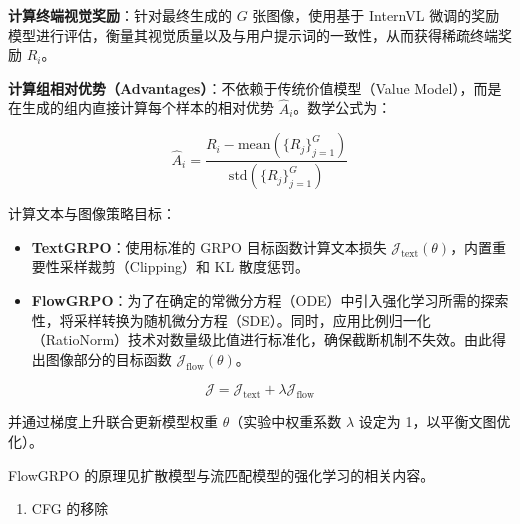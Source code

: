 \textbf{计算终端视觉奖励}：针对最终生成的 \(G\) 张图像，使用基于 InternVL 微调的奖励模型进行评估，衡量其视觉质量以及与用户提示词的一致性，从而获得稀疏终端奖励 \(R_i\)。

\textbf{计算组相对优势（Advantages）}：不依赖于传统价值模型（Value Model），而是在生成的组内直接计算每个样本的相对优势 \(\hat A_i\)。数学公式为：

\[
\hat A_i=
\frac{R_i-\mathrm{mean}(\{R_j\}_{j=1}^{G})}
{\mathrm{std}(\{R_j\}_{j=1}^{G})}
\]

计算文本与图像策略目标：

\begin{itemize}
\tightlist
\item
  \textbf{TextGRPO}：使用标准的 GRPO 目标函数计算文本损失 \(\mathcal{J}_{\mathrm{text}}(\theta)\)，内置重要性采样裁剪（Clipping）和 KL 散度惩罚。
\item
  \textbf{FlowGRPO}：为了在确定的常微分方程（ODE）中引入强化学习所需的探索性，将采样转换为随机微分方程（SDE）。同时，应用比例归一化（RatioNorm）技术对数量级比值进行标准化，确保截断机制不失效。由此得出图像部分的目标函数 \(\mathcal{J}_{\mathrm{flow}}(\theta)\)。
\end{itemize}

\[
\mathcal{J}
=\mathcal{J}_{\mathrm{text}}+\lambda\mathcal{J}_{\mathrm{flow}}
\]

并通过梯度上升联合更新模型权重 \(\theta\)（实验中权重系数 \(\lambda\) 设定为 1，以平衡文图优化）。

FlowGRPO 的原理见扩散模型与流匹配模型的强化学习的相关内容。

\begin{enumerate}
\def\labelenumi{\arabic{enumi}.}
\setcounter{enumi}{2}
\tightlist
\item
  CFG 的移除
\end{enumerate}

